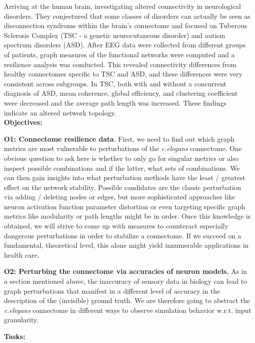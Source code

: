 \documentclass[a4paper,11pt]{article}
\begin{document}
Arriving at the human brain, \citep{Peters2013BrainFunctionalNetworks} investigating altered connectivity in neurological disorders. They conjectured that some classes of disorders can actually be seen as disconnection syndrome within the brain's connectome and focused on Tuberous Sclerosis Complex (TSC - a genetic neurocutaneous disorder) and autism spectrum disorders (ASD). After EEG data were collected from different groups of patients, graph measures of the functional networks were computed and a resilience analysis was conducted. This revealed connectivity differences from healthy connectomes specific to TSC and ASD, and these differences were very consistent across subgroups. In TSC, both with and without a concurrent diagnosis of ASD, mean coherence,
global efficiency, and clustering coefficient were decreased and the average path length was increased. These findings indicate an altered network topology.
\\[0,2cm]


\textbf{Objectives:}

\textbf{O1: Connectome resilience data}. First, we need to find out which graph metrics are most vulnerable to perturbations of the \emph{c.elegans} connectome. One obvious question to ask here is whether to only go for singular metrics or also inspect possible combinations and if the latter, what sets of combinations. We can then gain insights into what perturbation methods have the least / greatest effect on the network stability. Possible candidates are the classic perturbation via adding / deleting nodes or edges, but more sophisticated approaches like neuron activation function parameter distortion or even targeting specific graph metrics like modularity or path lengths might be in order. Once this knowledge is obtained, we will strive to come up with measures to counteract especially dangerous perturbations in order to stabilize a connectome. If we succeed on a fundamental, theoretical level, this alone might yield innumerable applications in health care.

\textbf{O2: Perturbing the connectome via accuracies of neuron models.} As in a section mentioned above, the inaccuracy of sensory data in biology can lead to graph perturbations that manifest in a different level of accuracy in the description of the (invisible) ground truth. We are therefore going to abstract the \emph{c.elegans} connectome in different ways to observe simulation behavior w.r.t. input granularity.


\textbf{Tasks:}
\end{document}
